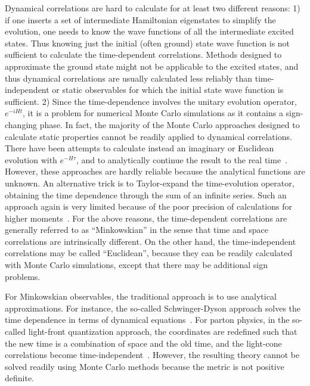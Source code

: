 Dynamical correlations are hard to calculate for at least two different reasons: 1)
if one inserts a set of intermediate Hamiltonian eigenstates to simplify the evolution,
one needs to know the wave functions of
all the intermediate excited states. Thus knowing just the initial (often ground) state wave function is not
sufficient to calculate the time-dependent correlations. Methods designed
to approximate the ground state might not be applicable to the excited states, and thus dynamical
correlations are usually calculated less reliably than time-independent or static
observables for which the initial state wave function is sufficient. 2) Since the time-dependence
involves the unitary evolution operator, $e^{-iHt}$, it is a problem for numerical Monte Carlo simulations as
it contains a sign-changing phase. In fact, the majority of the Monte Carlo approaches designed
to calculate static properties cannot be readily applied to dynamical correlations. There have been attempts
to calculate instead an imaginary or Euclidean evolution with $e^{-H\tau}$, and to analytically continue
the result to the real time~\cite{Nakahara:1999vy,Asakawa:2000tr}. However,
these approaches are hardly reliable because
the analytical functions are unknown. An alternative trick is to Taylor-expand the
time-evolution operator, obtaining the time dependence through the sum of an infinite series.
Such an approach again is very limited because of the poor precision of calculations
for higher moments~\cite{Hagler:2009ni}. For the above reasons, the time-dependent correlations
are generally referred to as ``Minkowskian'' in the sense that time and space correlations
are intrinsically different. On the other hand, the time-independent correlations may
be called ``Euclidean'', because they can be readily calculated with Monte Carlo simulations,
except that there may be additional sign problems.

For Minkowskian observables, the traditional approach is to use analytical approximations.
For instance, the so-called Schwinger-Dyson approach solves the time dependence
in terms of dynamical equations~\cite{Roberts:1994dr}. For parton physics, in the so-called light-front quantization approach,
the coordinates are redefined such that the new time is a combination of space and the old time, and
the light-cone correlations become time-independent~\cite{Burkardt:1995ct}. However, the resulting theory cannot be
solved readily using Monte Carlo methods because the metric is not positive definite.

